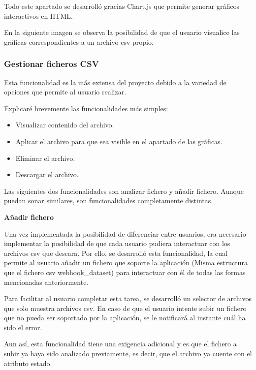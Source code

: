 Todo este apartado se desarrolló gracias Chart.js que permite generar gráficos interactivos en HTML.



En la siguiente imagen se observa la posibilidad de que el usuario visualice las gráficas correspondientes a un archivo csv propio. 



\subsubsection{Gestionar ficheros CSV}

Esta funcionalidad es la más extensa del proyecto debido a la variedad de opciones que permite al usuario realizar.

Explicaré brevemente las funcionalidades más simples:

\begin{itemize}
    \item Visualizar contenido del archivo.
    \item Aplicar el archivo para que sea visible en el apartado de las gráficas.
    \item Eliminar el archivo.
    \item Descargar el archivo.
\end{itemize}

Las siguientes dos funcionalidades son analizar fichero y añadir fichero. Aunque puedan sonar similares, son funcionalidades completamente distintas.

\textbf{Añadir fichero}

Una vez implementada la posibilidad de diferenciar entre usuarios, era necesario implementar la posibilidad de que cada usuario pudiera interactuar con los archivos csv que deseara. Por ello, se desarrolló esta funcionalidad, la cual permite al usuario añadir un fichero que soporte la aplicación (Misma estructura que el fichero csv webhook\_dataset) para interactuar con él de todas las formas mencionadas anteriormente.

Para facilitar al usuario completar esta tarea, se desarrolló un selector de archivos que solo muestra archivos csv. En caso de que el usuario intente subir un fichero que no pueda ser soportado por la aplicación, se le notificará al instante cuál ha sido el error. 

Aun así, esta funcionalidad tiene una exigencia adicional y es que el fichero a subir ya haya sido analizado previamente, es decir, que el archivo ya cuente con el atributo estado.

